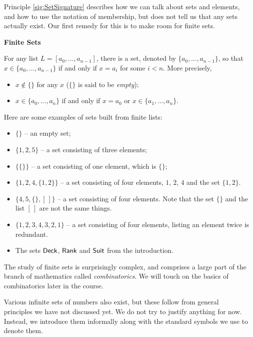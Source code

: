Principle \ref{sig:SetSignature} describes how we can talk about sets and elements, and how to use the notation of membership, but does not tell us that any sets actually exist. 
Our first remedy for this is to make room for finite sets.

\begin{principle}
\noindent\textbf{Finite Sets}

	For any list $L  = [a_0,\ldots, a_{n-1}]$, there is a set, denoted by $\{a_0,\ldots,a_{n-1}\}$, so
  that $x\in \{a_0,\ldots, a_{n-1}\}$ if and only if $x=a_i$ for some
  $i<n$.  More precisely,
  \begin{itemize}
  \item $x\notin \{\}$ for any $x$ ($\{\}$ is said to be \emph{empty});
  \item $x\in \{a_0,\ldots,a_n\}$ if and only if $x=a_0$ or $x\in
    \{a_1,\ldots,a_n\}$.
  \end{itemize}
\end{principle}

\printbreak

\begin{example}
Here are some examples of sets built from finite lists:
\begin{itemize}
\item $\{\}$ -- an empty set;
\item $\{1,2,5\}$ -- a set consisting of three elements;
\item $\{\{\}\}$ -- a set consisting of one element, which is $\{\}$;
\item $\{1,2,4,\{1,2\}\}$ -- a set consisting of four elements, $1$,
  $2$, $4$ and the set $\{1,2\}$.
\item $\{4,5, \{\}, [\,]\}$ -- a set consisting of four elements. Note that
the set $\{\}$ and the list $[\,]$ are not the same things.
\item $\{1,2,3,4,3,2,1\}$ -- a set consisting of four elements, listing an element twice is redundant.
\item The sets ${\mathord{\textsf{Deck}}}$, ${\mathord{\textsf{Rank}}}$ and ${\mathord{\textsf{Suit}}}$ from the introduction.
\end{itemize}
\end{example}

The study of finite sets is surprisingly complex, and comprises a large part of the branch of mathematics called \emph{combinatorics}. 
We will touch on the basics of combinatorics later in the course. 

Various infinite sets of numbers also exist, but these follow from general principles we have not discussed yet. 
We do not try to justify anything for now.
Instead, we introduce them informally along with the standard symbols we use to denote them.

